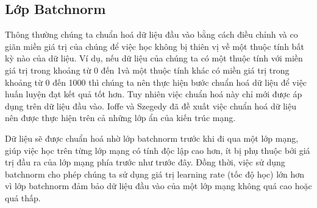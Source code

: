 \subsection{Lớp Batchnorm}
\label{subsec:lop_batchnorm}
	Thông thường chúng ta chuẩn hoá dữ liệu đầu vào bằng cách điều chỉnh và co giãn miền giá trị của chúng để việc học không bị thiên vị về một thuộc tính bất kỳ nào của dữ liệu. Ví dụ, nếu dữ liệu của chúng ta có một thuộc tính với miền giá trị trong khoảng từ 0 đến 1\linebreak và một thuộc tính khác có miền giá trị trong khoảng từ 0 đến 1000 thì chúng ta nên thực hiện bước chuẩn hoá dữ liệu để việc huấn luyện đạt kết quả tốt hơn. Tuy nhiên việc chuẩn hoá này chỉ mới được áp dụng trên dữ liệu đầu vào. Ioffe và Szegedy \cite{ioffe2015batch} đã đề xuất việc chuẩn hoá dữ liệu nên được thực hiện trên cả những lớp ẩn của kiến trúc mạng.
	
	Dữ liệu sẽ được chuẩn hoá nhờ lớp batchnorm trước khi đi qua một lớp mạng, giúp việc học trên từng lớp mạng có tính độc lập cao hơn, ít bị phụ thuộc bởi giá trị đầu ra của lớp mạng phía trước như trước đây. Đồng thời, việc sử dụng batchnorm cho phép chúng ta sử dụng giá trị learning rate (tốc độ học) lớn hơn vì lớp batchnorm đảm bảo dữ liệu đầu vào của một lớp mạng không quá cao hoặc quá thấp.
	

